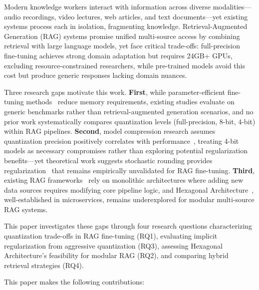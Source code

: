 \documentclass[pdflatex,sn-basic]{sn-jnl}
\begin{document}
Modern knowledge workers interact with information across diverse modalities—audio recordings, video lectures, web articles, and text documents—yet existing systems process each in isolation, fragmenting knowledge. Retrieval-Augmented Generation (RAG) systems promise unified multi-source access by combining retrieval with large language models, yet face critical trade-offs: full-precision fine-tuning achieves strong domain adaptation but requires 24GB+ GPUs, excluding resource-constrained researchers, while pre-trained models avoid this cost but produce generic responses lacking domain nuances.

Three research gaps motivate this work. \textbf{First}, while parameter-efficient fine-tuning methods~\citep{hu2022lora,dettmers2023qlora} reduce memory requirements, existing studies evaluate on generic benchmarks rather than retrieval-augmented generation scenarios, and no prior work systematically compares quantization levels (full-precision, 8-bit, 4-bit) within RAG pipelines. \textbf{Second}, model compression research assumes quantization precision positively correlates with performance~\citep{gholami2022survey,jacob2018quantization}, treating 4-bit models as necessary compromises rather than exploring potential regularization benefits—yet theoretical work suggests stochastic rounding provides regularization~\citep{gupta2015deep} that remains empirically unvalidated for RAG fine-tuning. \textbf{Third}, existing RAG frameworks~\citep{langchain2023,llamaindex2023,haystack2023} rely on monolithic architectures where adding new data sources requires modifying core pipeline logic, and Hexagonal Architecture~\citep{cockburn2005hexagonal}, well-established in microservices, remains underexplored for modular multi-source RAG systems.

This paper investigates these gaps through four research questions characterizing quantization trade-offs in RAG fine-tuning (RQ1), evaluating implicit regularization from aggressive quantization (RQ3), assessing Hexagonal Architecture's feasibility for modular RAG (RQ2), and comparing hybrid retrieval strategies (RQ4).

\noindent
This paper makes the following contributions:
\end{document}
